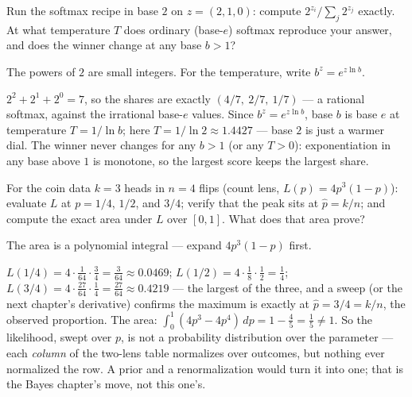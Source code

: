 \begin{problem}
Run the softmax recipe in base $2$ on $z = (2, 1, 0)$: compute
$2^{z_i} / \sum_j 2^{z_j}$ exactly. At what temperature $T$ does
ordinary (base-$e$) softmax reproduce your answer, and does the
winner change at any base $b > 1$?
\begin{hint}
The powers of $2$ are small integers. For the temperature, write
$b^z = e^{z \ln b}$.
\end{hint}
\begin{solution}
$2^2 + 2^1 + 2^0 = 7$, so the shares are exactly
$(4/7,\ 2/7,\ 1/7)$ — a rational softmax, against the irrational
base-$e$ values. Since $b^z = e^{z \ln b}$, base $b$ is base $e$ at
temperature $T = 1/\ln b$; here $T = 1/\ln 2 \approx 1.4427$ — base
$2$ is just a warmer dial. The winner never changes for any $b > 1$
(or any $T > 0$): exponentiation in any base above $1$ is monotone,
so the largest score keeps the largest share.
\end{solution}
\end{problem}

\begin{problem}
For the coin data $k = 3$ heads in $n = 4$ flips (count lens,
$L(p) = 4p^3(1-p)$): evaluate $L$ at $p = 1/4$, $1/2$, and $3/4$;
verify that the peak sits at $\hat{p} = k/n$; and compute the exact
area under $L$ over $[0, 1]$. What does that area prove?
\begin{hint}
The area is a polynomial integral — expand $4p^3(1-p)$ first.
\end{hint}
\begin{solution}
$L(1/4) = 4 \cdot \tfrac{1}{64} \cdot \tfrac{3}{4} = \tfrac{3}{64}
\approx 0.0469$;
$L(1/2) = 4 \cdot \tfrac{1}{8} \cdot \tfrac{1}{2} = \tfrac{1}{4}$;
$L(3/4) = 4 \cdot \tfrac{27}{64} \cdot \tfrac{1}{4} = \tfrac{27}{64}
\approx 0.4219$ — the largest of the three, and a sweep (or the next
chapter's derivative) confirms the maximum is exactly at
$\hat{p} = 3/4 = k/n$, the observed proportion. The area:
$\int_0^1 (4p^3 - 4p^4)\, dp = 1 - \tfrac{4}{5} = \tfrac{1}{5} \neq 1$.
So the likelihood, swept over $p$, is not a probability distribution
over the parameter — each \emph{column} of the two-lens table
normalizes over outcomes, but nothing ever normalized the row. A
prior and a renormalization would turn it into one; that is the Bayes
chapter's move, not this one's.
\end{solution}
\end{problem}

